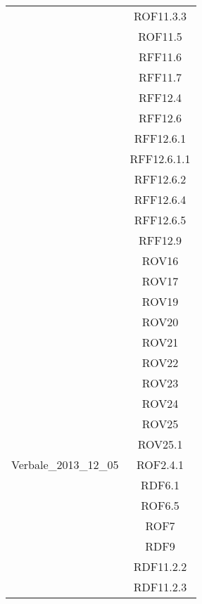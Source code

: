 \begin{longtable}{|c|c|}
& ROF11.3.3\\
& ROF11.5\\
& RFF11.6\\
& RFF11.7\\
& RFF12.4\\
& RFF12.6\\
& RFF12.6.1\\
& RFF12.6.1.1\\
& RFF12.6.2\\
& RFF12.6.4\\
& RFF12.6.5\\
& RFF12.9\\
& ROV16\\
& ROV17\\
& ROV19\\
& ROV20\\
& ROV21\\
& ROV22\\
& ROV23\\
& ROV24\\
& ROV25\\
& ROV25.1\\


\midrule
Verbale\_2013\_12\_05
& ROF2.4.1\\
& RDF6.1\\
& ROF6.5\\
& ROF7\\
& RDF9\\
& RDF11.2.2\\
& RDF11.2.3\\


\end{longtable}
